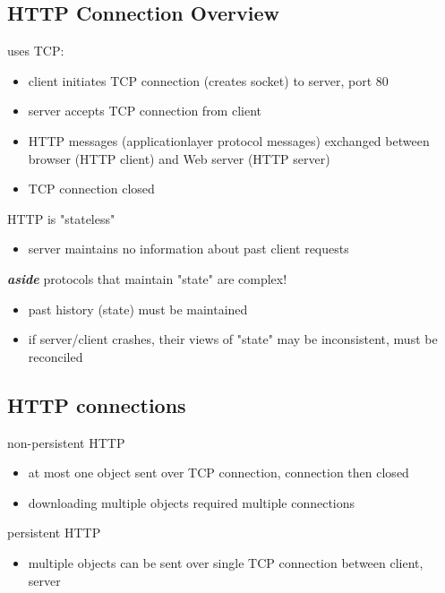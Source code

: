 \documentclass[fancy,11pt,titlestyle=display]{style/elegantbook}
\begin{document}
\subsection{HTTP Connection Overview}
uses TCP:
\begin{itemize}
\item client initiates TCP
connection (creates socket)
to server, port 80
\item server accepts TCP
connection from client
\item HTTP messages (applicationlayer protocol messages)
exchanged between
browser (HTTP client) and
Web server (HTTP server)
\item TCP connection closed
\end{itemize}
\*
HTTP is "stateless"
\begin{itemize}
\item server maintains no
information about
past client requests
\end{itemize}
\textbf{\textit{aside}}
\*
protocols that maintain "state" are complex!
\begin{itemize}
\item past history (state) must be
maintained
\item if server/client crashes, their
views of "state" may be
inconsistent, must be
reconciled
\end{itemize}

\subsection{HTTP connections}
non-persistent HTTP
\begin{itemize}
\item at most one object sent over TCP
connection, connection then closed
\item downloading multiple objects
required multiple connections
\end{itemize}
\*
persistent HTTP
\begin{itemize}
\item multiple objects can be
sent over single TCP
connection between
client, server
\end{itemize}


\vfill
\graphicspath{{image/myfolder/}}
\end{document}
